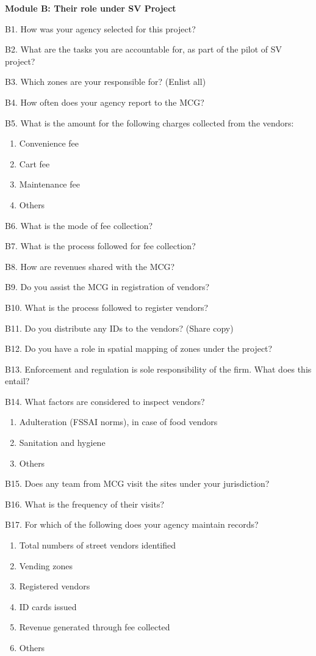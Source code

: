\documentclass[a4paper, 12pt, twoside]{article}
\begin{document}
{{\begin{mdframed}[backgroundcolor=gray!20]
\textbf{Module B: Their role under SV Project}

B1. How was your agency selected for this project?

B2. What are the tasks you are accountable for, as part of the pilot of SV project?

B3. Which zones are your responsible for? (Enlist all)

B4. How often does your agency report to the MCG?

B5. What is the amount for the following charges collected from the vendors:
\begin{enumerate}[nosep]
\item Convenience fee
\item Cart fee
\item Maintenance fee
\item Others
\end{enumerate}

B6.  What is the mode of fee collection?

B7. What is the process followed for fee collection?

B8. How are revenues shared with the MCG?

B9. Do you assist the MCG in registration of vendors?

B10. What is the process followed to register vendors?

B11. Do you distribute any IDs to the vendors? (Share copy)

B12. Do you have a role in spatial mapping of zones under the project?

B13. Enforcement and regulation is sole responsibility of the firm. What does this entail?

B14. What factors are considered to inspect vendors?
\begin{enumerate}[nosep]
\item Adulteration (FSSAI norms), in case of food vendors
\item Sanitation and hygiene
\item Others
\end{enumerate}

B15. Does any team from MCG visit the sites under your jurisdiction?

B16. What is the frequency of their visits?

B17.  For which of the following does your agency maintain records?
\begin{enumerate}[nosep]
\item Total numbers of street vendors identified
\item Vending zones
\item Registered vendors
\item ID cards issued
\item Revenue generated through fee collected
\item Others
\end{enumerate}


\end{mdframed}}}
\end{document}

